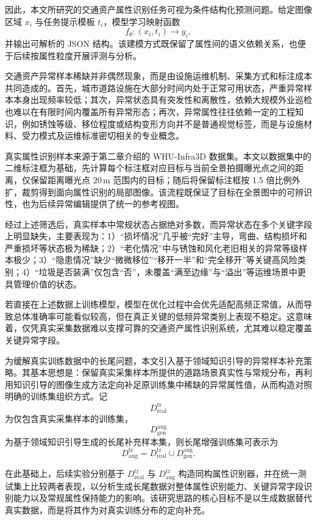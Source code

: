 因此，本文所研究的交通资产属性识别任务可视为条件结构化预测问题。给定图像区域 $x_i$ 与任务提示模板 $t_i$，模型学习映射函数
\[
 f_{\theta}:(x_i,t_i)\rightarrow y_i,
\]
并输出可解析的 JSON 结构。该建模方式既保留了属性间的语义依赖关系，也便于后续按属性粒度开展评测与分析。

交通资产异常样本稀缺并非偶然现象，而是由设施运维机制、采集方式和标注成本共同造成的。首先，城市道路设施在大部分时间内处于正常可用状态，严重异常样本本身出现频率较低；其次，异常状态具有突发性和离散性，依赖大规模外业巡检也难以在有限时间内覆盖所有异常形态；再次，异常属性往往依赖一定的工程知识，例如锈蚀等级、移位程度或结构变形方向并不是普通视觉标签，而是与设施材料、受力模式及运维标准密切相关的专业概念。

真实属性识别样本来源于第二章介绍的 WHU-Infra3D 数据集。本文以数据集中的二维标注框为基础，先计算每个标注框对应目标与当前全景拍摄曝光点之间的距离，仅保留距离曝光点 20\,m 范围内的目标；随后将保留标注框按 1.5 倍比例外扩，裁剪得到面向属性识别的局部图像。该流程既保证了目标在全景图中的可辨识性，也为后续异常编辑提供了统一的参考视图。

经过上述筛选后，真实样本中常规状态占据绝对多数，而异常状态在多个关键字段上明显缺失，主要表现为：1）“损坏情况”几乎被“完好”主导，弯曲、结构损坏和严重损坏等状态极为稀缺；2）“老化情况”中与锈蚀和风化老旧相关的异常等级样本极少；3）“隐患情况”缺少“微微移位”“移开一半”和“完全移开”等关键高风险类别；4）“垃圾是否装满”仅包含“否”，未覆盖“满至边缘”与“溢出”等运维场景中更具管理价值的状态。

若直接在上述数据上训练模型，模型在优化过程中会优先适配高频正常值，从而导致总体准确率可能看似较高，但在真正关键的低频异常类别上表现不稳定。这意味着，仅凭真实采集数据难以支撑可靠的交通资产属性识别系统，尤其难以稳定覆盖关键异常字段。

为缓解真实训练数据中的长尾问题，本文引入基于领域知识引导的异常样本补充策略。其基本思想是：保留真实采集样本所提供的道路场景真实性与常规分布，再利用知识引导的图像生成方法定向补足原训练集中稀缺的异常属性值，从而构造对照明确的训练集组织方式。记
\[
D_{\mathrm{real}}^{\mathrm{tr}}
\]
为仅包含真实采集样本的训练集，
\[
D_{\mathrm{gen}}^{\mathrm{aug}}
\]
为基于领域知识引导生成的长尾补充样本集，则长尾增强训练集可表示为
\[
D_{\mathrm{aug}}^{\mathrm{tr}} = D_{\mathrm{real}}^{\mathrm{tr}} \cup D_{\mathrm{gen}}^{\mathrm{aug}}.
\]

在此基础上，后续实验分别基于 $D_{\mathrm{real}}^{\mathrm{tr}}$ 与 $D_{\mathrm{aug}}^{\mathrm{tr}}$ 构造同构属性识别器，并在统一测试集上比较两者表现，以分析生成长尾数据对整体属性识别能力、关键异常字段识别能力以及常规属性保持能力的影响。该研究思路的核心目标不是以生成数据替代真实数据，而是将其作为对真实训练分布的定向补充。


